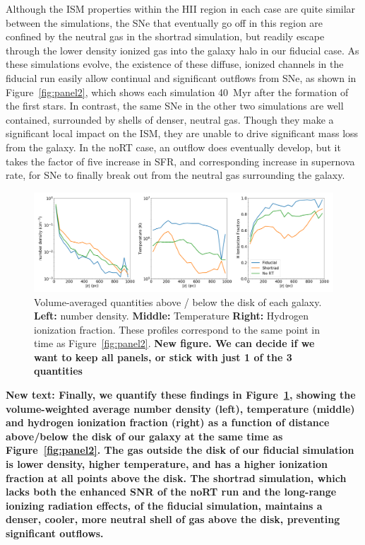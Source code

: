 \documentclass[twocolumn]{aastex62}
\begin{document}
{Although the ISM properties within the HII region in each case are quite similar between the simulations, the SNe that eventually go off in this region are confined by the neutral gas in the shortrad simulation, but readily escape through the lower density ionized gas into the galaxy halo in our fiducial case. As these simulations evolve, the existence of these diffuse, ionized channels in the fiducial run easily allow continual and significant outflows from SNe, as shown in  Figure~\ref{fig:panel2}, which shows each simulation 40~Myr after the formation of the first stars. In contrast, the same SNe in the other two simulations are well contained, surrounded by shells of denser, neutral gas. Though they make a significant local impact on the ISM, they are unable to drive significant mass loss from the galaxy. In the noRT case, an outflow does eventually develop, but it takes the factor of five increase in SFR, and corresponding increase in supernova rate, for SNe to finally break out from the neutral gas surrounding the galaxy. 

\begin{figure}
\centering
\includegraphics[width=0.98\linewidth]{density_temperature_ionization_z_profile}
\caption{Volume-averaged quantities above / below the disk of each galaxy. {\bf Left:} number density. {\bf Middle:} Temperature {\bf Right:} Hydrogen ionization fraction. These profiles correspond to the same point in time as Figure~\ref{fig:panel2}. \textbf{New figure. We can decide if we want to keep all panels, or stick with just 1 of the 3 quantities}}
\label{fig:vertical profiles}
\end{figure}

\textbf{New text: Finally, we quantify these findings in Figure~\ref{fig:vertical profiles}, showing the volume-weighted average number density (left), temperature (middle) and hydrogen ionization fraction (right) as a function of distance above/below the disk of our galaxy at the same time as Figure~\ref{fig:panel2}. The gas outside the disk of our fiducial simulation is lower density, higher temperature, and has a higher ionization fraction at all points above the disk. The shortrad simulation, which lacks both the enhanced SNR of the noRT run and the long-range ionizing radiation effects, of the fiducial simulation, maintains a denser, cooler, more neutral shell of gas above the disk, preventing significant outflows.}

}
\end{document}
